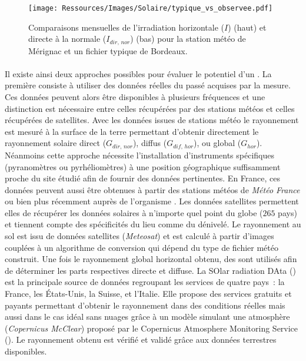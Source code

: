 \begin{figure}
    \centering
    \texttt{[image: Ressources/Images/Solaire/typique\_vs\_observee.pdf]}
    \caption[Comparaisons mensuelles de l’irradiation solaire entre un fichier typique et des données réelles]
            {Comparaisons mensuelles de l’irradiation horizontale ($I$) (haut) et
            directe à la normale ($I_{dir,\,nor}$) (bas) pour la station météo de Mérignac
            et un fichier typique de Bordeaux.}
    \label{fig:typique_vs_observee}
\end{figure}


\paragraph{} %
Il existe ainsi deux approches possibles pour évaluer le potentiel d’un .
La première consiste à utiliser des données réelles du passé
acquises par la mesure. Ces données peuvent alors être disponibles à plusieurs fréquences
et une distinction est nécessaire entre celles récupérées par des stations météos et
celles récupérées de satellites. Avec les données issues de stations
météo le rayonnement est mesuré à la surface de la terre permettant d’obtenir directement
le rayonnement solaire direct ($G_{dir,\,nor}$), diffus ($G_{dif,\,hor}$), ou global
($G_{hor}$). Néanmoins cette approche nécessite l’installation d’instruments spécifiques
(pyranomètres ou pyrhéliomètres) à une position géographique suffisamment proche du
site étudié afin de fournir des données pertinentes. En France, ces données peuvent aussi
être obtenues à partir des stations météos de \textit{Météo France} ou bien plus récemment auprès
de l’organisme .
Les données satellites permettent elles de récupérer les données solaires à n’importe quel
point du globe ($265$ pays) et tiennent compte des spécificités du lieu comme du dénivelé.
Le rayonnement au sol est issu de données satellites (\textit{Meteosat}) et est
calculé à partir d’images couplées à un algorithme de conversion qui dépend du type de
fichier météo construit. Une fois le rayonnement global horizontal obtenu, des
sont utilisés afin de déterminer les parts respectives directe et diffuse. La SOlar
radiation DAta () est la principale source de
données regroupant les services de quatre pays~: la France, les États-Unis, la Suisse, et
l’Italie. Elle propose des services gratuits et payants permettant d’obtenir le
rayonnement dans des conditions réelles mais aussi dans le cas idéal sans nuages grâce à
un modèle simulant une atmosphère (\textit{Copernicus McClear}) proposé par le
Copernicus Atmosphere Monitoring Service ().
Le rayonnement obtenu est vérifié et validé grâce aux données terrestres disponibles.

